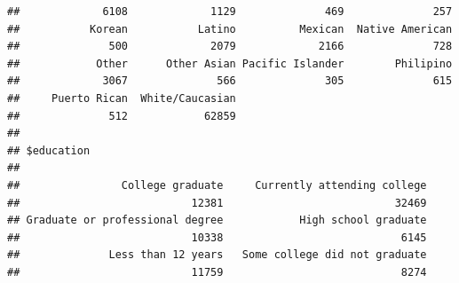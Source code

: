 \documentclass[
  english,
  man]{apa6}
\begin{document}
\begin{verbatim}
##             6108             1129              469              257 
##           Korean           Latino          Mexican  Native American 
##              500             2079             2166              728 
##            Other      Other Asian Pacific Islander        Philipino 
##             3067              566              305              615 
##     Puerto Rican  White/Caucasian 
##              512            62859 
## 
## $education
## 
##                College graduate     Currently attending college 
##                           12381                           32469 
## Graduate or professional degree            High school graduate 
##                           10338                            6145 
##              Less than 12 years   Some college did not graduate 
##                           11759                            8274
\end{verbatim}
\end{document}
